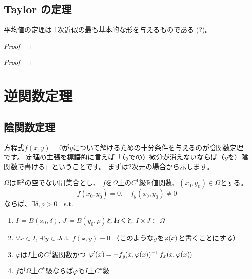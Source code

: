 \documentclass[report]{jlreq}
\begin{document}
\section{Taylor の定理}

平均値の定理は
1次近似の最も基本的な形を与えるものである (?)。

\begin{theorem}[平均値の定理]
    \TODO{}
\end{theorem}

\begin{proof}
    \TODO{}
\end{proof}

\begin{theorem}
    \TODO{}
\end{theorem}

\begin{proof}
    \TODO{}
\end{proof}



%
\chapter{逆関数定理}

%
\section{陰関数定理}

方程式$f(x, y) = 0$が$y$について解けるための十分条件を与えるのが陰関数定理です。
定理の主張を標語的に言えば「（$y$での）微分が消えないならば（$y$を）陰関数で書ける」ということです。
まずは2次元の場合から示します。

\begin{theorem}[2次元版の陰関数定理]
    $\Omega$は$\mathbb{R}^2$の空でない開集合とし、
    $f$を$\Omega$上の$C^1$級$\mathbb{R}$値関数、$(x_0, y_0) \in \Omega$とする。
    \begin{equation}
        f(x_0, y_0) = 0,\quad f_y(x_0, y_0) \neq 0
    \end{equation}
    ならば、$\exists \delta, \rho > 0\quad$s.t.
    \begin{enumerate}
        \item $I \coloneqq B(x_0, \delta),\,
            J \coloneqq B(y_0, \rho)$とおくと
            $\overline{I} \times \overline{J} \subset \Omega$
        \item $\forall x \in I,\, \exists! y \in J$\quad s.t. \quad
            $f(x, y) = 0$
            \quad（このような$y$を$\varphi(x)$と書くことにする）
        \item $\varphi$は$I$上の$C^1$級関数かつ
            $\varphi'(x) = - f_y(x, \varphi(x))^{-1}\, f_x(x, \varphi(x))$
        \item $f$が$\Omega$上$C^k$級ならば$\varphi$も$I$上$C^k$級
    \end{enumerate}
\end{theorem}
\end{document}
